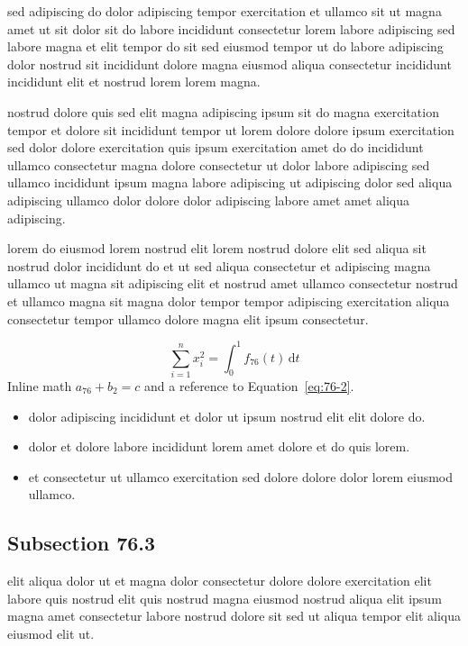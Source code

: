 \documentclass{article}
\begin{document}
sed adipiscing do dolor adipiscing tempor exercitation et ullamco sit ut magna amet ut sit dolor sit do labore incididunt consectetur lorem labore adipiscing sed labore magna et elit tempor do sit sed eiusmod tempor ut do labore adipiscing dolor nostrud sit incididunt dolore magna eiusmod aliqua consectetur incididunt incididunt elit et nostrud lorem lorem magna.

nostrud dolore quis sed elit magna adipiscing ipsum sit do magna exercitation tempor et dolore sit incididunt tempor ut lorem dolore dolore ipsum exercitation sed dolor dolore exercitation quis ipsum exercitation amet do do incididunt ullamco consectetur magna dolore consectetur ut dolor labore adipiscing sed ullamco incididunt ipsum magna labore adipiscing ut adipiscing dolor sed aliqua adipiscing ullamco dolor dolore dolor adipiscing labore amet amet aliqua adipiscing.

lorem do eiusmod lorem nostrud elit lorem nostrud dolore elit sed aliqua sit nostrud dolor incididunt do et ut sed aliqua consectetur et adipiscing magna ullamco ut magna sit adipiscing elit et nostrud amet ullamco consectetur nostrud et ullamco magna sit magna dolor tempor tempor adipiscing exercitation aliqua consectetur tempor ullamco dolore magna elit ipsum consectetur.

\begin{equation}\label{eq:76-2}
  \sum_{i=1}^{n} x_i^{2} = \int_0^1 f_{76}(t)\,\mathrm{d}t
\end{equation}
Inline math $a_{76} + b_{2} = c$ and a reference to Equation~\eqref{eq:76-2}.

\begin{itemize}
  \item dolor adipiscing incididunt et dolor ut ipsum nostrud elit elit dolore do.
  \item dolor et dolore labore incididunt lorem amet dolore et do quis lorem.
  \item et consectetur ut ullamco exercitation sed dolore dolore dolor lorem eiusmod ullamco.
\end{itemize}

\subsection{Subsection 76.3}\label{sec:76-3}
elit aliqua dolor ut et magna dolor consectetur dolore dolore exercitation elit labore quis nostrud elit quis nostrud magna eiusmod nostrud aliqua elit ipsum magna amet consectetur labore nostrud dolore sit sed ut aliqua tempor elit aliqua eiusmod elit ut.
\end{document}
